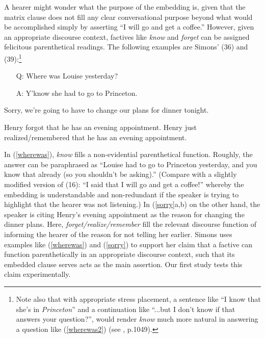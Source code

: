 \documentclass[output=paper]{LSP/langsci}
\begin{document}
A hearer might wonder what the purpose of the embedding is, given that the matrix clause does not fill any clear conversational purpose beyond what would be accomplished simply by asserting ``I will go and get a coffee.'' However, given an appropriate discourse context, factives like \textit{know} and \textit{forget} can be assigned felicitous parenthetical readings. The following examples are Simons' (36) and (39):\footnote{Note also that with appropriate stress placement, a sentence like ``I know that she's in \textit{Princeton}'' and a continuation like ``...but I don't know if that answers your question?'', would render \textit{know} much more natural in answering a question like (\ref{wherewas2}) (see \citealt{simons07}, p.1049).} %
\begin{exe}
	\ex \begin{itemize}
		\item[Q: ] Where was Louise yesterday?
		\item[A: ] Y'know she had to go to Princeton.
	\end{itemize} \label{wherewas}
	\ex  Sorry, we're going to have to change our plans for dinner tonight.
	\begin{xlist}
		\ex Henry forgot that he has an evening appointment.
		\ex Henry just realized/remembered that he has an evening appointment.
	\end{xlist} \label{sorry}
\end{exe}

In (\ref{wherewas}), \textit{know} fills a non-evidential parenthetical function. Roughly, the answer can be paraphrased as ``Louise had to go to Princeton yesterday, and you know that already (so you shouldn't be asking).'' (Compare with a slightly modified version of (16): ``I said that I will go and get a coffee!'' whereby the embedding is understandable and non-redundant if the speaker is trying to highlight that the hearer was not listening.)
In (\ref{sorry}a,b) on the other hand, the speaker is citing Henry's evening appointment as the reason for changing the dinner plans. Here, \textit{forget/realize/remember}  fill the relevant discourse function of informing the hearer of the reason for not telling her earlier. Simons uses examples like (\ref{wherewas}) and (\ref{sorry}) to support her claim that a factive can function parenthetically in an appropriate discourse context, such that its embedded clause serves acts as the main assertion. Our first study tests this claim experimentally.
\end{document}
